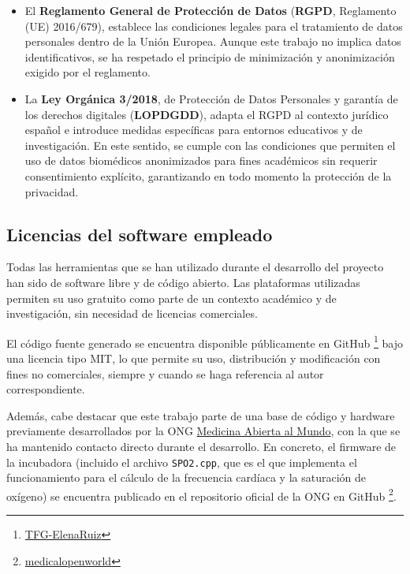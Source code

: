 \begin{itemize}
    \item El \textbf{Reglamento General de Protección de Datos} (\textbf{RGPD}, Reglamento (UE) 2016/679)\cite{rgpd2016}, establece las condiciones legales para el tratamiento de datos personales dentro de la Unión Europea. Aunque este trabajo no implica datos identificativos, se ha respetado el principio de minimización y anonimización exigido por el reglamento.
    
    \item La \textbf{Ley Orgánica 3/2018}, de Protección de Datos Personales y garantía de los derechos digitales (\textbf{LOPDGDD})\cite{lopd2018}, adapta el RGPD al contexto jurídico español e introduce medidas específicas para entornos educativos y de investigación. En este sentido, se cumple con las condiciones que permiten el uso de datos biomédicos anonimizados para fines académicos sin requerir consentimiento explícito, garantizando en todo momento la protección de la privacidad.
\end{itemize}

\vspace{0.3cm}
\subsection{Licencias del software empleado}

Todas las herramientas que se han utilizado durante el desarrollo del proyecto han sido de software libre y de código abierto. Las plataformas utilizadas permiten su uso gratuito como parte de un contexto académico y de investigación, sin necesidad de licencias comerciales.

El código fuente generado se encuentra disponible públicamente en GitHub \footnote{\href{https://github.com/ElenaRuizMoreno/TFG-Elena-Ruiz}{TFG-ElenaRuiz}} bajo una licencia tipo MIT, lo que permite su uso, distribución y modificación con fines no comerciales, siempre y cuando se haga referencia al autor correspondiente.

Además, cabe destacar que este trabajo parte de una base de código y hardware previamente desarrollados por la ONG \href{https://medicalopenworld.org/}{Medicina Abierta al Mundo}, con la que se ha mantenido contacto directo durante el desarrollo. En concreto, el firmware de la incubadora (incluido el archivo \texttt{SPO2.cpp}, que es el que implementa el funcionamiento para el cálculo de la frecuencia cardíaca y la saturación de oxígeno) se encuentra publicado en el repositorio oficial de la ONG en GitHub \footnote{\href{https://github.com/medicalopenworld/in3ator}{medicalopenworld}}.

